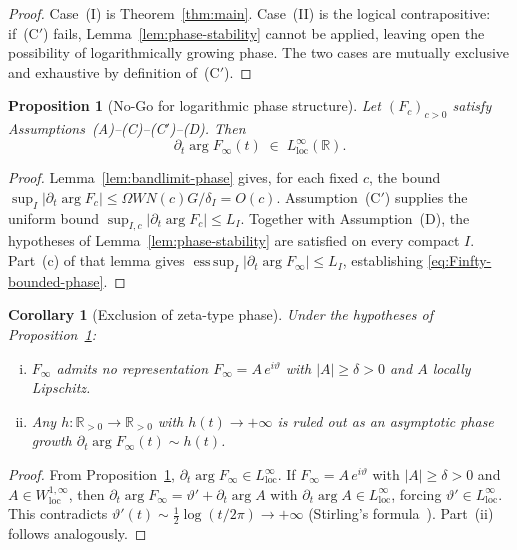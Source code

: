 \documentclass[12pt,a4paper]{amsart}
\newtheorem{proposition}[theorem]{Proposition}
\newtheorem{corollary}[theorem]{Corollary}
\theoremstyle{definition}
\begin{document}
\begin{proof}
Case~(I) is Theorem~\ref{thm:main}. Case~(II) is the
logical contrapositive: if~(C$'$) fails,
Lemma~\ref{lem:phase-stability} cannot be applied,
leaving open the possibility of logarithmically
growing phase. The two cases are mutually exclusive
and exhaustive by definition of~(C$'$).
\end{proof}

\begin{proposition}[No-Go for logarithmic phase
structure]
\label{prop:no-go}
Let $(F_c)_{c>0}$ satisfy
Assumptions~(A)--(C)--(C$'$)--(D). Then
\begin{equation}
\partial_t \arg F_\infty(t)
\;\in\; L^\infty_{\mathrm{loc}}(\mathbb{R}).
\label{eq:Finfty-bounded-phase}
\end{equation}
\end{proposition}

\begin{proof}
Lemma~\ref{lem:bandlimit-phase} gives, for each fixed
$c$, the bound
$\sup_{I}|\partial_t \arg F_c|
\le \Omega WN(c)G/\delta_I = O(c)$.
Assumption~(C$'$) supplies the uniform bound
$\sup_{I,c}|\partial_t \arg F_c| \le L_I$.
Together with Assumption~(D), the hypotheses of
Lemma~\ref{lem:phase-stability} are satisfied on
every compact $I$. Part~(c) of that lemma gives
$\operatorname{ess\,sup}_{I}
|\partial_t \arg F_\infty| \le L_I$,
establishing \eqref{eq:Finfty-bounded-phase}.
\end{proof}

\begin{corollary}[Exclusion of zeta-type phase]
\label{cor:no-zeta-phase}
Under the hypotheses of
Proposition~\ref{prop:no-go}:
\begin{enumerate}[(i)]
\item $F_\infty$ admits no representation
$F_\infty = A\,e^{i\vartheta}$ with
$|A| \ge \delta > 0$ and $A$ locally Lipschitz.
\item Any $h : \mathbb{R}_{>0} \to \mathbb{R}_{>0}$
with $h(t) \to +\infty$ is ruled out as an asymptotic
phase growth
$\partial_t \arg F_\infty(t) \sim h(t)$.
\end{enumerate}
\end{corollary}

\begin{proof}
From Proposition~\ref{prop:no-go},
$\partial_t \arg F_\infty
\in L^\infty_{\mathrm{loc}}$.
If $F_\infty = A\,e^{i\vartheta}$ with
$|A| \ge \delta > 0$ and
$A \in W^{1,\infty}_{\mathrm{loc}}$, then
$\partial_t \arg F_\infty
= \vartheta' + \partial_t \arg A$ with
$\partial_t \arg A \in L^\infty_{\mathrm{loc}}$,
forcing
$\vartheta' \in L^\infty_{\mathrm{loc}}$.
This contradicts
$\vartheta'(t)
\sim \tfrac{1}{2}\log(t/2\pi) \to +\infty$
(Stirling's formula~\cite{Titchmarsh1986}).
Part~(ii) follows analogously.
\end{proof}
\end{document}
